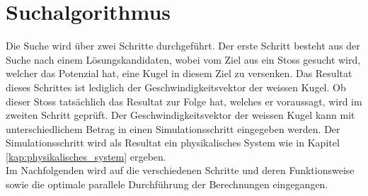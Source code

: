 \section{Suchalgorithmus}\label{kap:algorithmus_suche}
Die Suche wird über zwei Schritte durchgeführt. Der erste Schritt besteht aus der Suche nach einem Lösungskandidaten,
wobei vom Ziel aus ein Stoss gesucht wird, welcher das Potenzial hat, eine Kugel in diesem Ziel zu versenken. Das Resultat
dieses Schrittes ist lediglich der Geschwindigkeitsvektor der weissen Kugel.
Ob dieser Stoss tatsächlich das Resultat zur Folge hat, welches er voraussagt, wird im zweiten Schritt geprüft. Der
Geschwindigkeitsvektor der weissen Kugel kann mit unterschiedlichem Betrag in einen Simulationsschritt eingegeben werden.
Der Simulationsschritt wird als Resultat ein physikalisches System wie in Kapitel \ref{kap:physikalisches_system}
ergeben.
\\
Im Nachfolgenden wird auf die verschiedenen Schritte und deren Funktionsweise sowie die optimale parallele Durchführung
der Berechnungen eingegangen.




